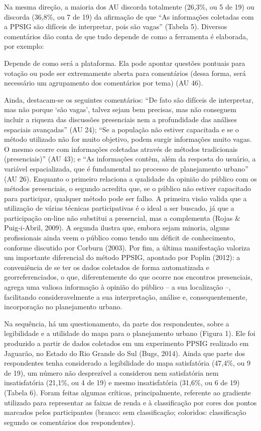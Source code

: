 \documentclass{article}
\begin{document}
\begin{multicols}{2}
Na mesma direção, a maioria dos AU discorda totalmente (26,3\%, ou 5 de 19) ou
discorda (36,8\%, ou 7 de 19) da afirmação de que “As informações
coletadas com a PPSIG são difíceis de interpretar, pois são vagas”
(Tabela 5). Diversos comentários dão
conta de que tudo depende de como a ferramenta é elaborada, por exemplo:

Depende de como será a plataforma. Ela pode apontar questões pontuais para
votação ou pode ser extremamente aberta para comentários (dessa forma, será
necessário um agrupamento dos comentários por tema) (AU
46).

Ainda, destacam-se os seguintes comentários: “De fato são difíceis de
interpretar, mas não porque ‘são vagas’, talvez sejam bem
precisas, mas não conseguem incluir a riqueza das discussões presenciais nem
a profundidade das análises espaciais avançadas” (AU 24);
“Se a população não estiver capacitada e se o método utilizado não
for muito objetivo, podem surgir informações muito vagas. O mesmo ocorre com
informações coletadas através de métodos tradicionais
(presenciais)” (AU 43); e “As informações contêm, além da
resposta do usuário, a variável espacializada, que é fundamental no processo
de planejamento urbano” (AU 26). Enquanto o primeiro relaciona a
qualidade da opinião do público com os métodos presenciais, o segundo acredita
que, se o público não estiver capacitado para participar, qualquer método pode
ser falho. A primeira visão valida que a utilização de várias técnicas
participativas é o ideal a ser buscado, já que a participação on-line não
substitui a presencial, mas a complementa (Rojas \& Puig‐i‐Abril, 2009). A
segunda ilustra que, embora sejam
minoria, alguns profissionais ainda veem o público como tendo um déficit de
conhecimento, conforme discutido por Corburn
(2003). Por fim, a última manifestação valoriza um importante
diferencial do método PPSIG, apontado por Poplin (2012): a conveniência de se
ter os dados coletados de forma
automatizada e georreferenciados, o que, diferentemente do que ocorre nos
encontros presenciais, agrega uma valiosa informação à opinião do público – a
sua localização –, facilitando consideravelmente a sua interpretação, análise e,
consequentemente, incorporação no planejamento urbano.

Na sequência, há um questionamento, da parte dos respondentes, sobre a
legibilidade e a utilidade do mapa para o planejamento urbano (Figura 1). Ele
foi produzido a partir de
dados coletados em um experimento PPSIG realizado em Jaguarão, no Estado do Rio
Grande do Sul (Bugs, 2014). Ainda que
parte dos respondentes tenha considerado a legibilidade do mapa satisfatória
(47,4\%, ou 9 de 19), um número não desprezível a considerou nem satisfatória
nem
insatisfatória (21,1\%, ou 4 de 19) e mesmo insatisfatória (31,6\%, ou 6 de 19)
(Tabela 6). Foram feitas algumas
críticas, principalmente, referente ao gradiente utilizado para representar as
faixas de renda e à classificação por cores dos pontos marcados pelos
participantes (branco: sem classificação; coloridos: classificação segundo os
comentários dos respondentes).


\end{multicols}
\end{document}
